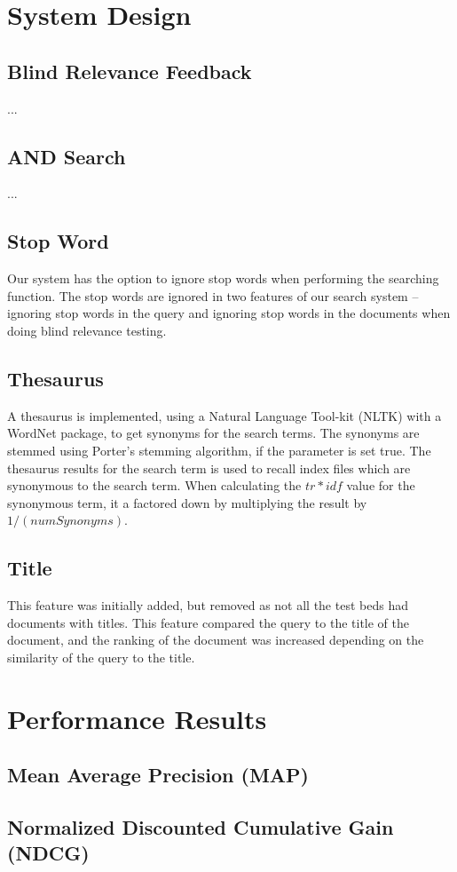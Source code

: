 \documentclass[11pt]{article}
\begin{document}


\section{System Design}
\subsection{Blind Relevance Feedback}
...

\subsection{AND Search}
...

\subsection{Stop Word}
Our system has the option to ignore stop words when performing the searching function. The stop words are ignored in two features of our search system – ignoring stop words in the query and ignoring stop words in the documents when doing blind relevance testing.

\subsection{Thesaurus}
A thesaurus is implemented, using a Natural Language Tool-kit (NLTK) with a WordNet package, to get synonyms for the search terms. The synonyms are stemmed using Porter's stemming algorithm, if the parameter is set true. The thesaurus results for the search term is used to recall index files which are synonymous to the search term. When calculating the \(tr*idf\) value for the synonymous term, it a factored down by multiplying the result by \(1/(numSynonyms)\).  

\subsection{Title}
This feature was initially added, but removed as not all the test beds had documents with titles. This feature compared the query to the title of the document, and the ranking of the document was increased depending on the similarity of the query to the title. 

\section{Performance Results}
\subsection{Mean Average Precision (MAP)}
\subsection{Normalized Discounted Cumulative Gain (NDCG)}
%
%
\end{document}
